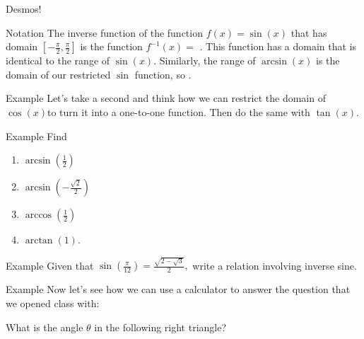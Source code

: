 \documentclass[presentation]{beamer}
\begin{document}
\begin{frame}[label={sec:orgda0edb9}]{Desmos!}
\end{frame}

\begin{frame}[label={sec:org42b3977}]{Notation}
The inverse function of the function \(f(x) = \sin(x)\) that has
domain \(\left[ - \frac{\pi}{2},\frac{\pi}{2} \right]\) is the
function \(f^{-1}(x) =\) \uline{\hspace*{1in}}.  This function has a domain
that is identical to the range of \(\sin(x)\).  Similarly, the range
of \(\arcsin(x)\) is the domain of our restricted \(\sin\) function,
so \uline{\hspace*{1in}}.
\end{frame}

\begin{frame}[label={sec:org124b32c}]{Example}
Let's take a second and think how we can restrict the domain of
\(\cos(x)\)to turn it into a one-to-one function.  Then do the same
with \(\tan(x).\)

\vspace{10in}
\end{frame}

\begin{frame}[label={sec:org4385638}]{Example}
Find
\begin{enumerate}
\item \(\arcsin \left( \frac{1}{2} \right)\)
\item \(\arcsin \left( - \frac{\sqrt{2}}{2} \right)\)
\item \(\arccos \left( \frac{1}{2} \right)\)
\item \(\arctan \left( 1 \right)\).
\end{enumerate}

\vspace{10in}
\end{frame}

\begin{frame}[label={sec:org37abc89}]{Example}
Given that \(\sin \left( \frac{\pi}{12} \right) =
\frac{\sqrt{2-\sqrt{3}}}{2},\) write a relation involving inverse
sine.

\vspace{10in}
\end{frame}

\begin{frame}[label={sec:orge6451d1}]{Example}
Now let's see how we can use a calculator to answer the question that we opened class with:

What is the angle \(\theta\) in the following right triangle?


\vspace{10in}
\end{frame}
\end{document}
